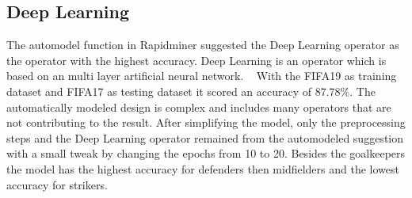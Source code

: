 \subsection{Deep Learning}

The automodel function in Rapidminer suggested the Deep Learning operator as the operator with the highest accuracy. Deep Learning is an operator which is based on an multi layer artificial neural network. ~\cite{ref_rapidminerDeepLearning} With the FIFA19 as training dataset and FIFA17 as testing dataset it scored an accuracy of 87.78\%. The automatically modeled design is complex and includes many operators that are not contributing to the result. After simplifying the model, only the preprocessing steps and the Deep Learning operator remained from the automodeled suggestion with a small tweak by changing the epochs from 10 to 20. %
Besides the goalkeepers the model has the highest accuracy for defenders then midfielders and the lowest accuracy for strikers.%

